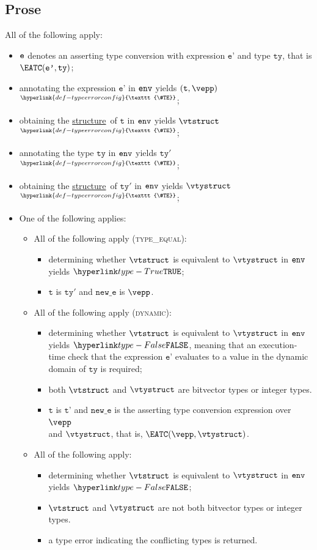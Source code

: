 \documentclass{book}
\newcommand\TypeErrorConfig[0]{\hyperlink{def-typeerrorconfig}{\texttt{\#TE}}}
\newcommand\ProseOrTypeError[0]{\hyperlink{def-proseortypeerror}{$^{\TypeErrorConfig}$}}
\newcommand\structure[0]{\hyperlink{def-structure}{structure}}
\newcommand\vt[0]{\texttt{t}}
\newcommand\tty[0]{\texttt{ty}}
\newcommand\newe[0]{\texttt{new\_e}}
\newcommand\vep[0]{\texttt{e'}}
\newcommand\vtp[0]{\texttt{t'}}
\begin{document}
\subsection{Prose}
All of the following apply:
\begin{itemize}
  \item $\texttt{e}$ denotes an asserting type conversion with expression $\vep$ and type $\tty$, that is $\EATC(\vep, \tty)$;
  \item annotating the expression $\vep$ in $\texttt{env}$ yields $(\vt, \vepp)$ \ProseOrTypeError;
  \item obtaining the \structure\ of $\vt$ in $\texttt{env}$ yields $\vtstruct$ \ProseOrTypeError;
  \item annotating the type $\tty$ in $\texttt{env}$ yields $\tty'$ \ProseOrTypeError;
  \item obtaining the \structure\ of $\tty'$ in $\texttt{env}$ yields $\vtystruct$ \ProseOrTypeError;
  \item One of the following applies:
  \begin{itemize}
  \item All of the following apply (\textsc{type\_equal}):
  \begin{itemize}
    \item determining whether $\vtstruct$ is equivalent to $\vtystruct$ in $\texttt{env}$ \\ yields $\True$;
    \item $\vt$ is $\tty'$ and $\newe$ is $\vepp$.
  \end{itemize}
  \item All of the following apply (\textsc{dynamic}):
    \begin{itemize}
      \item determining whether $\vtstruct$ is equivalent to $\vtystruct$ in $\texttt{env}$ \\ yields $\False$,
      meaning that an execution-time check that the expression $\vep$ evaluates to a value in the
      dynamic domain of $\tty$ is required;
      \item both $\vtstruct$ and $\vtystruct$ are bitvector types or integer types.
      \item $\vt$ is $\vtp$ and $\newe$ is the asserting type conversion expression over $\vepp$ \\ and
      $\vtystruct$, that is, $\EATC(\vepp, \vtystruct)$.
    \end{itemize}
  \item All of the following apply:
    \begin{itemize}
    \item determining whether $\vtstruct$ is equivalent to $\vtystruct$ in $\texttt{env}$ \\ yields $\False$;
    \item $\vtstruct$ and $\vtystruct$ are not both bitvector types or integer types.
    \item a type error indicating the conflicting types is returned.
    \end{itemize}
  \end{itemize}
\end{itemize}
\end{document}
